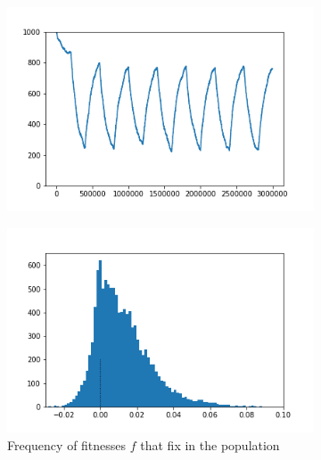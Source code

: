 \documentclass{article}
\begin{document}
\begin{figure}[h]
	\centering
	\begin{subfigure}[t]{0.32\linewidth}
		\centering
		\includegraphics[width = 1.0\linewidth, trim={0 0 0 0}, clip=true]{figures/changing_resample_selection_trajec.png}
		\label{fig:changing_resample_trajec}	
	\end{subfigure}
	\hspace{0.01\linewidth}
	\begin{subfigure}[t]{0.32\linewidth}
		\centering
		\includegraphics[width = 1.0\linewidth, trim={0 0 0 0}, clip=true]{figures/changing_resample_selection_hist2.png}
		\caption{Frequency of fitnesses $f$ that fix in the population}
		\label{fig:changing_resample_hist}
	\end{subfigure}
	\begin{subfigure}[t]{0.32\linewidth}

\end{subfigure}
\end{figure}
\end{document}
